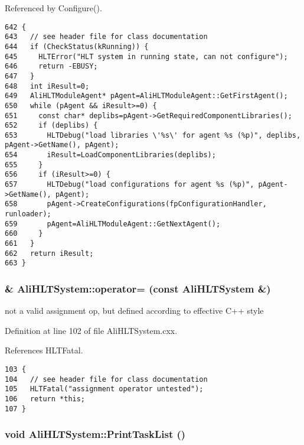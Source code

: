 Referenced by Configure().

\footnotesize\begin{verbatim}642 {
643   // see header file for class documentation
644   if (CheckStatus(kRunning)) {
645     HLTError("HLT system in running state, can not configure");
646     return -EBUSY;
647   }
648   int iResult=0;
649   AliHLTModuleAgent* pAgent=AliHLTModuleAgent::GetFirstAgent();
650   while (pAgent && iResult>=0) {
651     const char* deplibs=pAgent->GetRequiredComponentLibraries();
652     if (deplibs) {
653       HLTDebug("load libraries \'%s\' for agent %s (%p)", deplibs, pAgent->GetName(), pAgent);
654       iResult=LoadComponentLibraries(deplibs);
655     }
656     if (iResult>=0) {
657       HLTDebug("load configurations for agent %s (%p)", pAgent->GetName(), pAgent);
658       pAgent->CreateConfigurations(fpConfigurationHandler, runloader);
659       pAgent=AliHLTModuleAgent::GetNextAgent();
660     }
661   }
662   return iResult;
663 }
\end{verbatim}\normalsize 


\subsubsection{ \& Ali\-HLTSystem::operator= (const {\bf Ali\-HLTSystem} \&)}\label{classAliHLTSystem_a2}


not a valid assignment op, but defined according to effective C++ style 

Definition at line 102 of file Ali\-HLTSystem.cxx.

References HLTFatal.

\footnotesize\begin{verbatim}103 { 
104   // see header file for class documentation
105   HLTFatal("assignment operator untested");
106   return *this;
107 }
\end{verbatim}\normalsize 


\subsubsection{\setlength{\rightskip}{0pt plus 5cm}void Ali\-HLTSystem::Print\-Task\-List ()}\label{classAliHLTSystem_a12}


